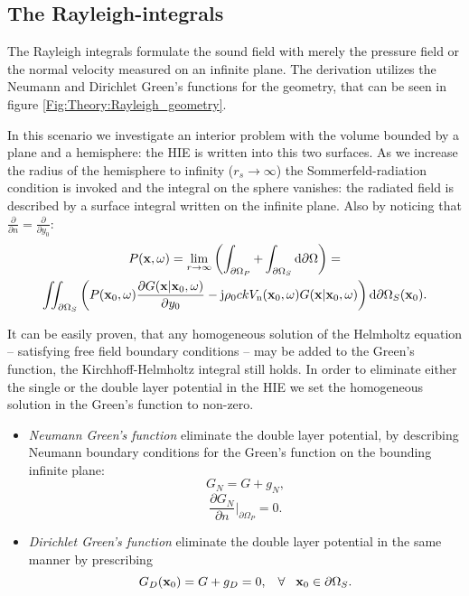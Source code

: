 \subsection{The Rayleigh-integrals}
\label{Section:Theory:Rayleigh}

The Rayleigh integrals formulate the sound field with merely the pressure field or the normal velocity measured on an infinite plane. The derivation utilizes the Neumann and Dirichlet Green's functions for the geometry, that can be seen in figure \ref{Fig:Theory:Rayleigh_geometry}.

In this scenario we investigate an interior problem with the volume bounded by a plane and a hemisphere: the HIE is written into this two surfaces. As we increase the radius of the hemisphere to infinity ($r_s \rightarrow \infty$) the Sommerfeld-radiation condition is invoked and the integral on the sphere vanishes: the radiated field is described by a surface integral written on the infinite plane. Also by noticing that $\frac{\partial}{\partial n} = \frac{\partial}{\partial y_0}$:
\begin{multline}
P(\mathbf{x},\omega) = \lim_{r\rightarrow \infty} \left( \int_{\partial \Omega_P} + \int_{\partial \Omega_S} \mathrm{d} \partial \Omega \right) = \\
\iint_{\partial \Omega_S}  \left( 
P(\mathbf{x}_0,\omega)  \frac{\partial G(\mathbf{x}|\mathbf{x}_0,\omega)}{\partial y_0}  -
\mathrm{j} \rho_0 c k V_{\mathrm{n}}(\mathbf{x}_0,\omega)  G(\mathbf{x}|\mathbf{x}_0,\omega) 
\right)   \mathrm{d} \partial \Omega_S ( \mathbf{x}_0).
\end{multline}

It can be easily proven, that any homogeneous solution of the Helmholtz equation -- satisfying free field boundary conditions -- may be added to the Green's function, the Kirchhoff-Helmholtz integral still holds. In order to eliminate either the single or the double layer potential in the HIE we set the homogeneous solution in the Green's function to non-zero.\begin{itemize}
\item \emph{Neumann Green's function} eliminate the double layer potential, by describing Neumann boundary conditions for the Green's function on the bounding infinite plane:
\begin{equation}
G_N = G + g_N,
\end{equation}
\begin{equation}
\frac{\partial G_N}{\partial n}|_{\partial \Omega_P} = 0.
\label{Eq:Theory:Neumann_Greenfun_def}
\end{equation}
\item \emph{Dirichlet Green's function} eliminate the double layer potential in the same manner by prescribing
\begin{equation}
G_D(\mathbf{x}_0) = G + g_D = 0, \hspace{3mm} \forall \hspace{3mm} \mathbf{x}_0 \in \partial \Omega_S.
\end{equation}
\end{itemize}

